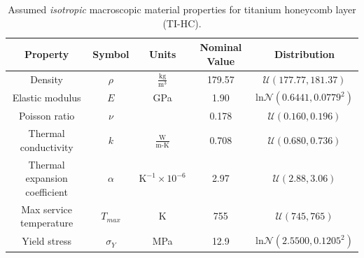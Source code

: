 \documentclass{article}
\begin{document}
\begin{table}
\caption[TI-HC material properties]{Assumed \textit{isotropic} macroscopic material properties for titanium honeycomb layer (TI-HC).}
\label{tab:matPropTI-HC}
\begin{center}
\begin{tabular}[]{ c | c | c | c | c }
\textbf{Property} & \textbf{Symbol} & \textbf{Units} & \textbf{Nominal Value} & \textbf{Distribution} \\ \hline
Density & $\rho$ & $\frac{\textrm{kg}}{\textrm{m}^3}$ & 179.57 & $\mathcal{U}(177.77,181.37)$ \\ \hline
Elastic modulus& $E$ & GPa & 1.90 & $\textrm{ln}\mathcal{N}(0.6441,0.0779^2)$ \\ \hline
Poisson ratio & $\nu$ & & 0.178 & $\mathcal{U}(0.160,0.196)$ \\ \hline
Thermal conductivity & $k$ & $\frac{\textrm{W}}{\textrm{m-K}}$ & 0.708 &  $\mathcal{U}(0.680,0.736)$ \\ \hline
Thermal expansion coefficient & $\alpha$ & $\textrm{K}^{-1} \times 10^{-6}$ & 2.97 & $\mathcal{U}(2.88,3.06)$ \\ \hline \hline
Max service temperature & $T_{max}$ & K & 755 &  $\mathcal{U}(745,765)$ \\ \hline
Yield stress & $\sigma_Y$ & MPa & 12.9 & $\textrm{ln}\mathcal{N}(2.5500,0.1205^2)$ \\ \hline
\end{tabular}
\end{center}
\end{table}
\end{document}
